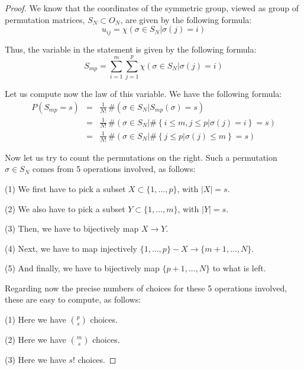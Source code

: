 \documentclass[12pt]{amsbook}
\begin{document}
\begin{proof}
We know that the coordinates of the symmetric group, viewed as group of permutation matrices, $S_N\subset O_N$, are given by the following formula:
$$u_{ij}=\chi\left(\sigma\in S_N\Big|\sigma(j)=i\right)$$

Thus, the variable in the statement is given by the following formula:
$$S_{mp}=\sum_{i=1}^m\sum_{j=1}^p\chi\left(\sigma\in S_N\Big|\sigma(j)=i\right)$$

Let us compute now the law of this variable. We have the following formula:
\begin{eqnarray*}
P(S_{mp}=s)
&=&\frac{1}{N!}\,\#\left(\sigma\in S_N\Big|S_{mp}(\sigma)=s\right)\\
&=&\frac{1}{N!}\,\#\left(\sigma\in S_N\Big|\#\left\{i\leq m,j\leq p\big|\sigma(j)=i\right\}=s\right)\\
&=&\frac{1}{N!}\,\#\left(\sigma\in S_N\Big|\#\left\{j\leq p\big|\sigma(j)\leq m\right\}=s\right)
\end{eqnarray*}

Now let us try to count the permutations on the right. Such a permutation $\sigma\in S_N$ comes from 5 operations involved, as follows:

\medskip

(1) We first have to pick a subset $X\subset\{1,\ldots,p\}$, with $|X|=s$.

\medskip

(2) We also have to pick a subset $Y\subset\{1,\ldots,m\}$, with $|Y|=s$.

\medskip

(3) Then, we have to bijectively map $X\to Y$.

\medskip

(4) Next, we have to map injectively $\{1,\ldots,p\}-X\to\{m+1,\ldots,N\}$.

\medskip

(5) And finally, we have to bijectively map $\{p+1,\ldots,N\}$ to what is left.

\medskip

Regarding now the precise numbers of choices for these 5 operations involved, these are easy to compute, as follows:

\medskip

(1) Here we have $\binom{p}{s}$ choices.

\medskip

(2) Here we have $\binom{m}{s}$ choices.

\medskip

(3) Here we have $s!$ choices.


\end{proof}
\end{document}

